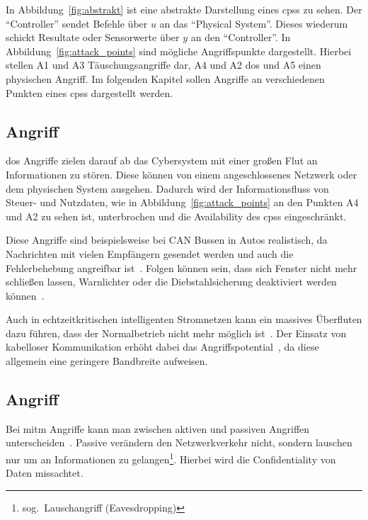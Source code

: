 \documentclass[final,bibliography=totocnumbered]{include/sikseminar}
\newcommand{\cps}{\glspl{cps}\xspace}
\begin{document}
In Abbildung~\ref{fig:abstrakt} ist eine abstrakte Darstellung eines \cps zu sehen.
Der \enquote{Controller} sendet Befehle über $u$ an das \enquote{Physical System}.
Dieses wiederum schickt Resultate oder Sensorwerte über $y$ an den \enquote{Controller}.
In Abbildung~\ref{fig:attack_points} sind mögliche Angriffspunkte dargestellt.
Hierbei stellen A1 und A3 Täuschungsangriffe dar, A4 und A2 \gls{dos} und A5 einen physischen Angriff.
Im folgenden Kapitel sollen Angriffe an verschiedenen Punkten eines \cps dargestellt werden.


\subsection{ Angriff}\label{subsec:dos}
\gls{dos} Angriffe zielen darauf ab das Cybersystem mit einer großen Flut an Informationen zu stören.
Diese können von einem angeschlossenes Netzwerk oder dem physischen System ausgehen.
Dadurch wird der Informationsfluss von Steuer- und Nutzdaten, wie in Abbildung~\ref{fig:attack_points} an den Punkten A4 und A2 zu sehen ist, unterbrochen und die Availability des \cps eingeschränkt.

Diese Angriffe sind beispielsweise bei CAN Bussen in Autos realistisch, da Nachrichten mit vielen Empfängern gesendet werden und auch die Fehlerbehebung angreifbar ist~\cite{Koscher2010,Cheminod2013}.%
Folgen können sein, dass sich Fenster nicht mehr schließen lassen, Warnlichter oder die Diebstahlsicherung deaktiviert werden können~\cite{Hoppe2008}.

Auch in echtzeitkritischen intelligenten Stromnetzen kann ein massives Überfluten dazu führen, dass der Normalbetrieb nicht mehr möglich ist~\cite{Lu2010}.
Der Einsatz von kabelloser Kommunikation erhöht dabei das Angriffspotential~\cite{Lu2011}, da diese allgemein eine geringere Bandbreite aufweisen.

\subsection{ Angriff}\label{subsec:mitm}
Bei \gls{mitm} Angriffe kann man zwischen aktiven und passiven Angriffen unterscheiden~\cite{WYX+10}.
Passive verändern den Netzwerkverkehr nicht, sondern lauschen nur um an Informationen zu gelangen\footnote{sog.\ Lauschangriff (Eavesdropping)}.
Hierbei wird die Confidentiality von Daten missachtet.
\end{document}
